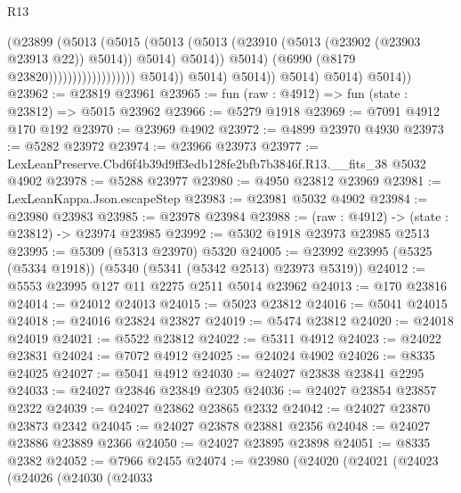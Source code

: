 \begin{lexlean}{R13}
\begin{coremodule}
                                                    (@23899
                                                      (@5013
                                                        (@5015
                                                          (@5013
                                                            (@5013
                                                              (@23910
                                                                (@5013
                                                                  (@23902 (@23903 @23913 @22))
                                                                  @5014))
                                                              @5014)
                                                            @5014))
                                                        @5014)
                                                      (@6990 (@8179 @23820))))))))))))))))))
                      @5014))
                  @5014)
                @5014))
            @5014)
          @5014)
        @5014))
@23962 := @23819 @23961
@23965 := fun (raw : @4912) => fun (state : @23812) => @5015 @23962
@23966 := @5279 @1918
@23969 := @7091 @4912 @170 @192
@23970 := @23969 @4902
@23972 := @4899 @23970 @4930
@23973 := @5282 @23972
@23974 := @23966 @23973
@23977 := LexLeanPreserve.Cbd6f4b39d9ff3edb128fe2bfb7b3846f.R13.__fits_38 @5032 @4902
@23978 := @5288 @23977
@23980 := @4950 @23812 @23969
@23981 := LexLeanKappa.Json.escapeStep
@23983 := @23981 @5032 @4902
@23984 := @23980 @23983
@23985 := @23978 @23984
@23988 := (raw : @4912) -> (state : @23812) -> @23974 @23985
@23992 := @5302 @1918 @23973 @23985 @2513
@23995 := @5309 (@5313 @23970) @5320
@24005 := @23992 @23995 (@5325 (@5334 @1918)) (@5340 (@5341 (@5342 @2513) @23973 @5319))
@24012 := @5553 @23995 @127 @11 @2275 @2511 @5014 @23962
@24013 := @170 @23816
@24014 := @24012 @24013
@24015 := @5023 @23812
@24016 := @5041 @24015
@24018 := @24016 @23824 @23827
@24019 := @5474 @23812
@24020 := @24018 @24019
@24021 := @5522 @23812
@24022 := @5311 @4912
@24023 := @24022 @23831
@24024 := @7072 @4912
@24025 := @24024 @4902
@24026 := @8335 @24025
@24027 := @5041 @4912
@24030 := @24027 @23838 @23841 @2295
@24033 := @24027 @23846 @23849 @2305
@24036 := @24027 @23854 @23857 @2322
@24039 := @24027 @23862 @23865 @2332
@24042 := @24027 @23870 @23873 @2342
@24045 := @24027 @23878 @23881 @2356
@24048 := @24027 @23886 @23889 @2366
@24050 := @24027 @23895 @23898
@24051 := @8335 @2382
@24052 := @7966 @2455
@24074 := @23980
    (@24020
      (@24021
        (@24023
          (@24026
            (@24030
              (@24033

\end{coremodule}
\end{lexlean}
